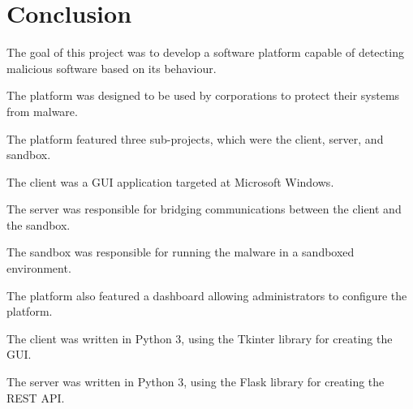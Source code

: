 \chapter{Conclusion}

The goal of this project was to develop a software platform capable of detecting malicious software based on its behaviour.
	

The platform was designed to be used by corporations to protect their systems from malware.	

The platform featured three sub-projects, which were the client, server, and sandbox.

The client was a GUI application targeted at Microsoft Windows.

The server was responsible for bridging communications between the client and the sandbox.

The sandbox was responsible for running the malware in a sandboxed environment.

The platform also featured a dashboard allowing administrators to configure the platform.

The client was written in Python 3, using the Tkinter library for creating the GUI.

The server was written in Python 3, using the Flask library for creating the REST API.